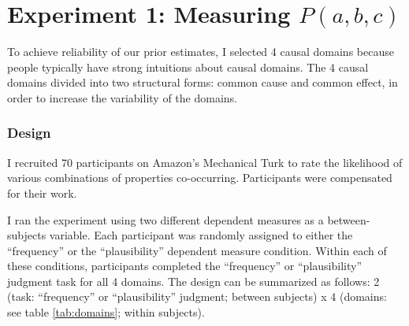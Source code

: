 \documentclass{article} %
\begin{document}
\section{Experiment 1: Measuring $P(a, b, c)$}
\label{prelicit}

To achieve reliability of our prior estimates, I selected 4 causal domains because people typically have strong intuitions about causal domains. The 4 causal domains divided into two structural forms: common cause and common effect, in order to increase the variability of the domains. 

\subsubsection{Design}

I recruited 70 participants on Amazon's Mechanical Turk to rate the likelihood of various combinations of properties co-occurring. Participants were compensated for their work.

I ran the experiment using two different dependent measures as a between-subjects variable. Each participant was randomly assigned to either the ``frequency'' or the ``plausibility'' dependent measure condition. Within each of these conditions, participants completed the ``frequency'' or ``plausibility'' judgment task for all 4 domains. The design can be summarized as follows: 2 (task: ``frequency'' or ``plausibility'' judgment; between subjects) x 4 (domains: see table \ref{tab:domains}; within subjects).
\end{document}
